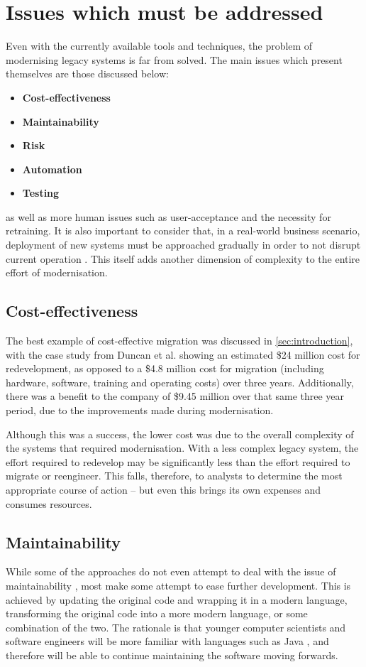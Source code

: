 \documentclass[12pt,journal,compsoc]{IEEEtran}
\begin{document}
\section{Issues which must be addressed}
\label{sec:issues}
Even with the currently available tools and techniques, the problem of modernising legacy systems is far from solved. The main issues which present themselves are those discussed below:
\begin{itemize}
\item\textbf{Cost-effectiveness}
\item\textbf{Maintainability}
\item\textbf{Risk}
\item\textbf{Automation}
\item\textbf{Testing}
\end{itemize}
as well as more human issues such as user-acceptance and the necessity for retraining. It is also important to consider that, in a real-world business scenario, deployment of new systems must be approached gradually in order to not disrupt current operation \cite{Sneed2008,Duncan1996,Almonaies2010}. This itself adds another dimension of complexity to the entire effort of modernisation.

\subsection{Cost-effectiveness}
\label{subsec:costeffectiveness}
The best example of cost-effective migration was discussed in \autoref{sec:introduction}, with the case study from Duncan et al. \cite{Duncan1996} showing an estimated \$24 million cost for redevelopment, as opposed to a \$4.8 million cost for migration (including hardware, software, training and operating costs) over three years. Additionally, there was a benefit to the company of \$9.45 million over that same three year period, due to the improvements made during modernisation.

Although this was a success, the lower cost was due to the overall complexity of the systems that required modernisation. With a less complex legacy system, the effort required to redevelop may be significantly less than the effort required to migrate or reengineer. This falls, therefore, to analysts to determine the most appropriate course of action -- but even this brings its own expenses and consumes resources.

\subsection{Maintainability}
\label{subsec:maintainability}
While some of the approaches do not even attempt to deal with the issue of maintainability \cite{Stroulia2002}, most make some attempt to ease further development. This is achieved by updating the original code and wrapping it in a modern language, transforming the original code into a more modern language, or some combination of the two. The rationale is that younger computer scientists and software engineers will be more familiar with languages such as Java \cite{Sneed2013}, and therefore will be able to continue maintaining the software moving forwards.
\end{document}
